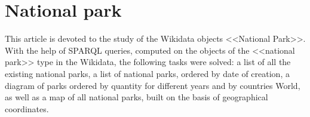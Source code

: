 \chapter{National park}
\label{ch:national-park}


This article is devoted to the study of the Wikidata objects <<National Park>>. With the help of SPARQL queries, computed on the objects of the <<national park>> type in the Wikidata, the following tasks were solved: a list of all the existing national parks, a list of national parks, ordered by date of creation, a diagram of parks ordered by quantity for different years and by countries World, as well as a map of all national parks, built on the basis of geographical coordinates.